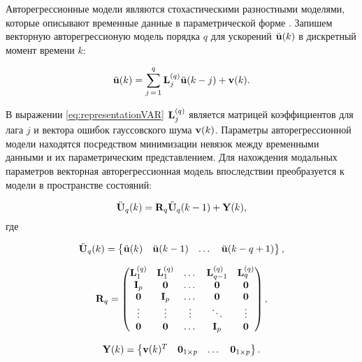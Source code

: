 Авторегрессионные модели являются стохастическими разностными моделями, которые описывают временные данные в параметрической форме \cite{lib:oma:Chen}. Запишем векторную авторегрессионую модель порядка $ q $ для ускорений $ \ddot{\mathbf{u}}(k) $ в дискретный момент времени $ k $:

\begin{equation}
	\ddot{\mathbf{u}}(k) = \sum_{j\,=\,1} ^ q \mathbf{L}_j^{(q)} \ddot{\mathbf{u}}(k - j) + \mathbf{v}(k). \label{eq:representationVAR}
\end{equation}

В выражении \eqref{eq:representationVAR} $ \mathbf{L}_j^{(q)} $ является матрицей коэффициентов для лага $ j $ и вектора ошибок гауссовского шума $ \mathbf{v}(k) $. Параметры авторегрессионной модели находятся посредством минимизации невязок между временными данными и их параметрическим представлением. Для нахождения модальных параметров векторная авторегрессионная модель впоследствии преобразуется к модели в пространстве состояний:

\begin{equation}
	\ddot{\mathbf{U}}_q(k) = \mathbf{R}_q \ddot{\mathbf{U}}_q(k - 1) + \mathbf{Y}(k),
\end{equation} 
где 

\begin{equation}
	 \ddot{\mathbf{U}}_q(k) = \begin{Bmatrix} \ddot{\mathbf{u}}(k) & \ddot{\mathbf{u}}(k - 1) & \dots & \ddot{\mathbf{u}}(k - q + 1) \end{Bmatrix},
\end{equation}

\begin{equation}
	\mathbf{R}_q = 
	\begin{pmatrix}
		\mathbf{L}_1^{(q)} & \mathbf{L}_1^{(q)} & \dots & \mathbf{L}_{q-1}^{(q)} & \mathbf{L}_q^{(q)} \\
		\mathbf{I}_p & \mathbf{0} & \dots & \mathbf{0} & \mathbf{0} \\ 
		\mathbf{0} & \mathbf{I}_p & \dots & \mathbf{0} & \mathbf{0} \\ 
		\vdots & \vdots & \vdots & \ddots & \vdots \\ 
		\mathbf{0} & \mathbf{0} & \dots & \mathbf{I}_p & \mathbf{0} 
	\end{pmatrix},
\end{equation}

\begin{equation}
	\mathbf{Y}(k) = \begin{Bmatrix} \mathbf{v}(k) ^ T & \mathbf{0}_{1 \times p} & \dots & \mathbf{0}_{1 \times p} \end{Bmatrix}.
\end{equation}

